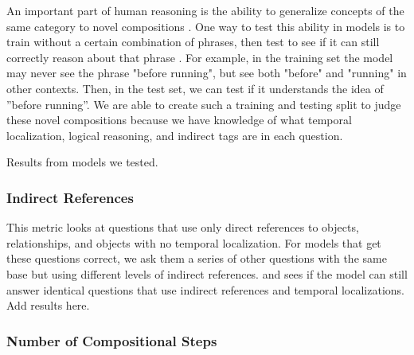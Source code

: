 \documentclass[10pt,twocolumn,letterpaper]{article}
\newcommand{\mgm}[1]{{\color{cyan}{mgm: #1}}}
\begin{document}
An important part of human reasoning is the ability to generalize concepts of the same category to novel compositions \cite{}. One way to test this ability in models is to train without a certain combination of phrases, then test to see if it can still correctly reason about that phrase \cite{lake2018generalization}. For example, in the training set the model may never see the phrase "before running", but see both "before" and "running" in other contexts. Then, in the test set, we can test if it understands the  idea  of  ”before running”.   We are able to create such a training and testing split to judge these  novel  compositions  because  we  have  knowledge  of what temporal localization, logical reasoning, and indirect tags are in each question.

Results from models we tested.

\subsubsection{Indirect References}

This metric looks at questions that use only direct references to objects, relationships, and objects with no temporal localization. For models that get these questions correct, we ask them a series of other questions with the same base but using different levels of indirect references. \mgm{If i do it, say that we only add in indirect references } and sees if the model can still answer identical questions that use indirect references and temporal localizations. Add results here.

\mgm{maybe look at if it can answer questions where the whole indirect reference is masked}

\mgm{This will only be interesting if we fix indirects not affecting accuracy.}

\mgm{May want to make a separate table for this one too }

\subsubsection{Number of Compositional Steps}
\end{document}
